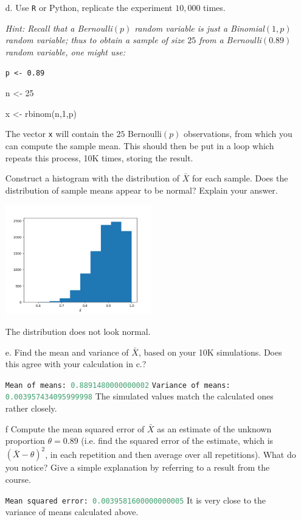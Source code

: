 \documentclass{article}
\newcommand{\1}{\mathbf{1}}
\begin{document}
\begin{itemize}
    
    
    \newpage
    \item[d.] Use {\tt R} or Python, replicate the experiment $10,000$ times. \par
    {\it Hint: Recall that a Bernoulli$(p)$ random variable is just a Binomial$(1,p)$ random variable; thus to obtain a sample of size $25$ from a Bernoulli$(0.89)$ random variable, one might use:\par
    {\tt p <- 0.89\par
        n <- 25\par
        x <- rbinom(n,1,p)
    }\par
    The vector {\tt x} will contain the $25$ Bernoulli$(p)$ observations, from which you can compute the sample mean. This should then be put in a loop which repeats this process, 10K times, storing the result.} Construct a histogram with the distribution of $\bar{X}$ for each sample. Does the distribution of sample means appear to be normal? Explain your answer. 
    
    \begin{center}
        \includegraphics[width=0.5\textwidth]{STATS509/HW7/HW7Figures/Problem1.png}
    \end{center}
    
    The distribution does not look normal. 
    
    
    
    
    \item[e.] Find the mean and variance of $\bar{X}$, based on your 10K simulations.  Does this agree with your calculation in c.?

    \lstinline[language=Python]{Mean of means: 0.8891480000000002}\newline
    \lstinline[language=Python]{Variance of means: 0.003957434095999998} \newline
    The simulated values match the calculated ones rather closely.
    

    \item[f] Compute the mean squared error of $\bar{X}$ as an estimate of the unknown proportion $\theta=0.89$ (i.e. find the squared error of the estimate, which is $(\bar{X} - \theta)^2$, in each repetition and then average over all repetitions). What do you notice? Give a simple explanation by referring to a result from the course.
    
    \lstinline[language=Python]{Mean squared error: 0.0039581600000000005} \newline
    It is very close to the variance of means calculated above. 
\end{itemize}
\end{document}
